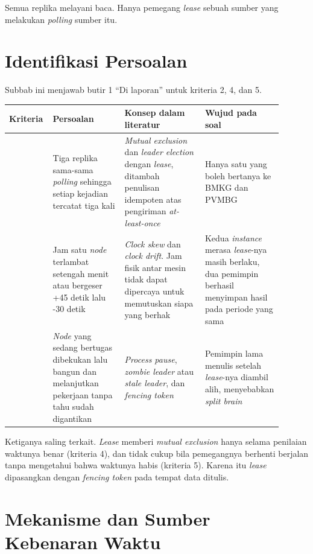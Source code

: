 Semua replika melayani baca. Hanya pemegang \textit{lease} sebuah sumber yang melakukan \textit{polling} sumber itu.

\section{Identifikasi Persoalan}

Subbab ini menjawab butir 1 ``Di laporan'' untuk kriteria 2, 4, dan 5.

\begin{longtable}[]{|>{\raggedright\arraybackslash}p{0.1\linewidth}|>{\raggedright\arraybackslash}p{0.25\linewidth}|>{\raggedright\arraybackslash}p{0.28\linewidth}|>{\raggedright\arraybackslash}p{0.27\linewidth}|}
\hline
\textbf{Kriteria} & \textbf{Persoalan} & \textbf{Konsep dalam literatur} & \textbf{Wujud pada soal} \\
\hline
\endhead
2 & Tiga replika sama-sama \textit{polling} sehingga setiap kejadian tercatat tiga kali & \textit{Mutual exclusion} dan \textit{leader election} dengan \textit{lease}, ditambah penulisan idempoten atas pengiriman \textit{at-least-once} & Hanya satu yang boleh bertanya ke BMKG dan PVMBG \\
\hline
4 & Jam satu \textit{node} terlambat setengah menit atau bergeser +45 detik lalu -30 detik & \textit{Clock skew} dan \textit{clock drift}. Jam fisik antar mesin tidak dapat dipercaya untuk memutuskan siapa yang berhak & Kedua \textit{instance} merasa \textit{lease}-nya masih berlaku, dua pemimpin berhasil menyimpan hasil pada periode yang sama \\
\hline
5 & \textit{Node} yang sedang bertugas dibekukan lalu bangun dan melanjutkan pekerjaan tanpa tahu sudah digantikan & \textit{Process pause}, \textit{zombie leader} atau \textit{stale leader}, dan \textit{fencing token} & Pemimpin lama menulis setelah \textit{lease}-nya diambil alih, menyebabkan \textit{split brain} \\
\hline
\end{longtable}

Ketiganya saling terkait. \textit{Lease} memberi \textit{mutual exclusion} hanya selama penilaian waktunya benar (kriteria 4), dan tidak cukup bila pemegangnya berhenti berjalan tanpa mengetahui bahwa waktunya habis (kriteria 5). Karena itu \textit{lease} dipasangkan dengan \textit{fencing token} pada tempat data ditulis.

\section{Mekanisme dan Sumber Kebenaran Waktu}

